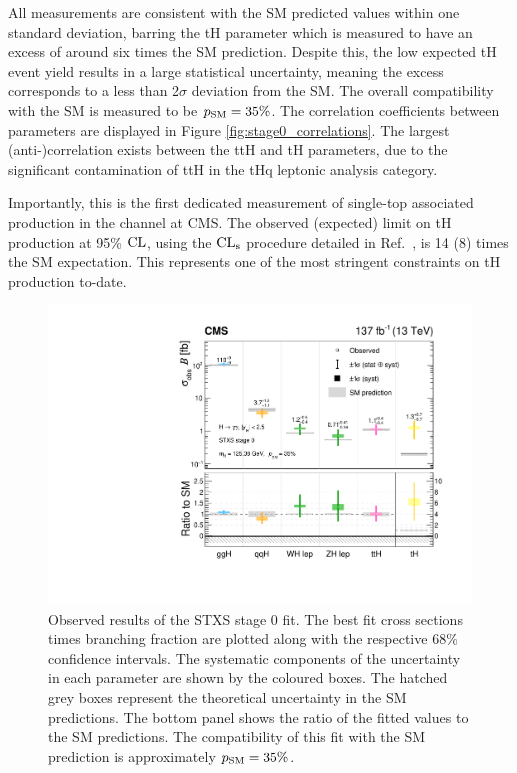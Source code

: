 All measurements are consistent with the SM predicted values within one standard deviation, barring the tH parameter which is measured to have an excess of around six times the SM prediction. Despite this, the low expected tH event yield results in a large statistical uncertainty, meaning the excess corresponds to a less than 2$\sigma$ deviation from the SM. The overall compatibility with the SM is measured to be $p_{\rm{SM}}=35\%$. The correlation coefficients between parameters are displayed in Figure \ref{fig:stage0_correlations}. The largest (anti-)correlation exists between the ttH and tH parameters, due to the significant contamination of ttH in the tHq leptonic analysis category.

Importantly, this is the first dedicated measurement of single-top associated production in the \Hgg channel at CMS. The observed (expected) limit on tH production at 95\% $\rm{CL}$, using the $\rm{CL}_s$ procedure detailed in Ref.~\cite{CMS-NOTE-2011-005}, is 14 (8) times the SM expectation. This represents one of the most stringent constraints on tH production to-date.

\begin{figure}[htb!]
  \centering
  \includegraphics[width=.6\textwidth]{Figures/hgg_results/stage0_summary.pdf}
  \caption[Results of the STXS stage 0 fit]
  {
    Observed results of the STXS stage 0 fit. The best fit cross sections times branching fraction are plotted along with the respective 68\% confidence intervals. The systematic components of the uncertainty in each parameter are shown by the coloured boxes. The hatched grey boxes represent the theoretical uncertainty in the SM predictions. The bottom panel shows the ratio of the fitted values to the SM predictions. The compatibility of this fit with the SM prediction is approximately $p_{\rm{SM}}=35\%$. 
  }
  \label{fig:stage0_results}
\end{figure}

